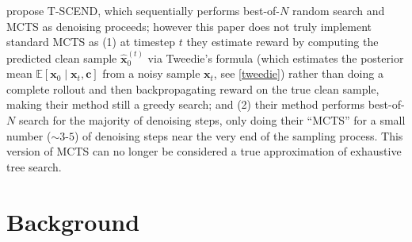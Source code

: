 \documentclass{article}
\newcommand{\x}{\mathbf{x}}
\begin{document}
\cite{zhang2025tscendtesttimescalablemctsenhanced} propose T-SCEND, which sequentially performs best-of-$N$ random search and MCTS as denoising proceeds; however this paper does not truly implement standard MCTS as (1) at timestep $t$ they estimate reward by computing the predicted clean sample $\hat{\x}_0^{(t)}$ via Tweedie's formula \citep{tweedie} (which estimates the
posterior mean $\mathbb{E}[\x_0 \mid \x_t, \mathbf{c}]$ from a noisy sample $\x_t$, see \autoref{tweedie}) rather than doing a complete rollout and then backpropagating reward on the true clean sample, making their method still a greedy search; and (2) their method performs best-of-$N$ search for the majority of denoising steps, only doing their ``MCTS'' for a small number ($\sim$$3$-$5$) of denoising steps near the very end of the sampling process. This version of MCTS can no longer be considered a true approximation of exhaustive tree search.






\section{Background}
\label{prelim}
%
\end{document}
